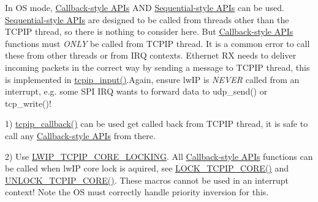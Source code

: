 In OS mode, \hyperlink{group__callbackstyle__api}{Callback-\/style A\+P\+Is} A\+ND \hyperlink{group__sequential__api}{Sequential-\/style A\+P\+Is} can be used. \hyperlink{group__sequential__api}{Sequential-\/style A\+P\+Is} are designed to be called from threads other than the T\+C\+P\+IP thread, so there is nothing to consider here. But \hyperlink{group__callbackstyle__api}{Callback-\/style A\+P\+Is} functions must {\itshape O\+N\+LY} be called from T\+C\+P\+IP thread. It is a common error to call these from other threads or from I\+RQ contexts. ​\+Ethernet RX needs to deliver incoming packets in the correct way by sending a message to T\+C\+P\+IP thread, this is implemented in \hyperlink{group__lwip__os_gae510f195171bed8499ae94e264a92717}{tcpip\+\_\+input()}.​​ Again, ensure lw\+IP is {\itshape N\+E\+V\+ER} called from an interrupt, e.\+g. some S\+PI I\+RQ wants to forward data to udp\+\_\+send() or tcp\+\_\+write()!

1) \hyperlink{group__lwip__os_ga7eb868a1215472ec38f3f2a04d442b9f}{tcpip\+\_\+callback()} can be used get called back from T\+C\+P\+IP thread, it is safe to call any \hyperlink{group__callbackstyle__api}{Callback-\/style A\+P\+Is} from there.

2) Use \hyperlink{group__lwip__opts__lock_ga8e46232794349c209e8ed4e9e7e4f011}{L\+W\+I\+P\+\_\+\+T\+C\+P\+I\+P\+\_\+\+C\+O\+R\+E\+\_\+\+L\+O\+C\+K\+I\+NG}. All \hyperlink{group__callbackstyle__api}{Callback-\/style A\+P\+Is} functions can be called when lw\+IP core lock is aquired, see \hyperlink{native_2lwip_2src_2include_2lwip_2tcpip_8h_a4700525e737fc025fea4887b172e0c95}{L\+O\+C\+K\+\_\+\+T\+C\+P\+I\+P\+\_\+\+C\+O\+R\+E()} and \hyperlink{native_2lwip_2src_2include_2lwip_2tcpip_8h_a915effea029b9c4891e1ec635eb1826d}{U\+N\+L\+O\+C\+K\+\_\+\+T\+C\+P\+I\+P\+\_\+\+C\+O\+R\+E()}. These macros cannot be used in an interrupt context! Note the OS must correctly handle priority inversion for this. 